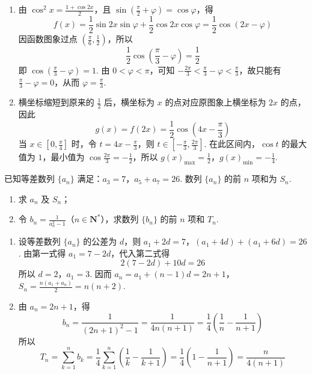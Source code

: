 \begin{solution}
\begin{enumerate}
\item 由 \(\cos^2x=\frac{1+\cos2x}{2}\)，且 \(\sin\left(\frac{\pi}{2}+\varphi\right)=\cos\varphi\)，得
\[
f(x)=\frac12\sin2x\sin\varphi+\frac12\cos2x\cos\varphi=\frac12\cos\left(2x-\varphi\right)
\]
因函数图象过点 \(\left(\frac{\pi}{6},\frac12\right)\)，所以
\[
\frac12\cos\left(\frac{\pi}{3}-\varphi\right)=\frac12
\]
即 \(\cos\left(\frac{\pi}{3}-\varphi\right)=1\). 由 \(0<\varphi<\pi\)，可知 \(-\frac{2\pi}{3}<\frac{\pi}{3}-\varphi<\frac{\pi}{3}\)，故只能有 \(\frac{\pi}{3}-\varphi=0\)，从而 \(\varphi=\frac{\pi}{3}\).
\item 横坐标缩短到原来的 \(\frac12\) 后，横坐标为 \(x\) 的点对应原图象上横坐标为 \(2x\) 的点，因此
\[
g(x)=f(2x)=\frac12\cos\left(4x-\frac{\pi}{3}\right)
\]
当 \(x\in\left[0,\frac{\pi}{4}\right]\) 时，令 \(t=4x-\frac{\pi}{3}\)，则 \(t\in\left[-\frac{\pi}{3},\frac{2\pi}{3}\right]\). 在此区间内，\(\cos t\) 的最大值为 \(1\)，最小值为 \(\cos\frac{2\pi}{3}=-\frac12\)，所以
\(g(x)_{\max}=\frac12\)，\(g(x)_{\min}=-\frac14\).
\end{enumerate}
\end{solution}

\begin{problem}
已知等差数列 \(\{a_{n}\}\) 满足：\(a_{3} = 7\)，\(a_{5} + a_{7} = 26\). 数列 \(\{a_{n}\}\) 的前 \(n\) 项和为 \(S_{n}\).
\begin{enumerate}
\item 求 \(a_{n}\) 及 \(S_{n}\)；
\item 令 \( b_{n} = \frac{1}{a_{n}^{2} - 1} \)（\(n \in \mathbf{N}^{*}\)），求数列 \(\{b_{n}\}\) 的前 \(n\) 项和 \(T_{n}\).
\end{enumerate}
\end{problem}

\begin{solution}
\begin{enumerate}
\item 设等差数列 \(\{a_n\}\) 的公差为 \(d\)，则
\(a_1+2d=7\)，\((a_1+4d)+(a_1+6d)=26\).
由第一式得 \(a_1=7-2d\)，代入第二式得
\[
2(7-2d)+10d=26
\]
所以 \(d=2\)，\(a_1=3\). 因而
\(a_n=a_1+(n-1)d=2n+1\)，\(S_n=\frac{n(a_1+a_n)}2=n(n+2)\).
\item 由 \(a_n=2n+1\)，得
\[
b_n=\frac{1}{(2n+1)^2-1}=\frac{1}{4n(n+1)}=\frac14\left(\frac1n-\frac{1}{n+1}\right)
\]
所以
\[
T_n=\sum_{k=1}^{n}b_k=\frac14\sum_{k=1}^{n}\left(\frac1k-\frac{1}{k+1}\right)=\frac14\left(1-\frac{1}{n+1}\right)=\frac{n}{4(n+1)}
\]
\end{enumerate}
\end{solution}

